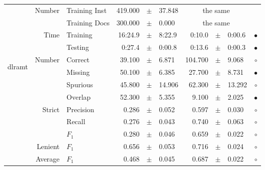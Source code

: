 \begin{longtable}{|r|r|l||rcl|rcl|c|}
\cline{2-10} & \multirow{2}{*}{    Number} &   Training Inst &     419.000 &  $\pm$  &      37.848 &    \multicolumn{3}{c|}{the same}         &  \\
\cline{3-10} &                             &   Training Docs &     300.000 &  $\pm$  &       0.000 &    \multicolumn{3}{c|}{the same}         &  \\
\cline{2-10} & \multirow{2}{*}{      Time} &        Training &     16:24.9 &  $\pm$  &      8:22.9 &      0:10.0 &  $\pm$  &      0:00.6 & $\bullet$ \\
\cline{3-10} &                             &         Testing &      0:27.4 &  $\pm$  &      0:00.8 &      0:13.6 &  $\pm$  &      0:00.3 & $\bullet$ \\
\hline
\hline
\multirow{11}{*}{\begin{sideways}dlramt\end{sideways} }
             & \multirow{4}{*}{    Number} &         Correct &      39.100 &  $\pm$  &       6.871 &     104.700 &  $\pm$  &       9.068 & $\circ$ \\
\cline{3-10} &                             &         Missing &      50.100 &  $\pm$  &       6.385 &      27.700 &  $\pm$  &       8.731 & $\bullet$ \\
\cline{3-10} &                             &        Spurious &      45.800 &  $\pm$  &      14.906 &      62.300 &  $\pm$  &      13.292 & $\circ$ \\
\cline{3-10} &                             &         Overlap &      52.300 &  $\pm$  &       5.355 &       9.100 &  $\pm$  &       2.025 & $\bullet$ \\
\cline{2-10} & \multirow{3}{*}{    Strict} &       Precision &       0.286 &  $\pm$  &       0.052 &       0.597 &  $\pm$  &       0.030 & $\circ$ \\
\cline{3-10} &                             &          Recall &       0.276 &  $\pm$  &       0.043 &       0.740 &  $\pm$  &       0.063 & $\circ$ \\
\cline{3-10} &                             &           $F_1$ &       0.280 &  $\pm$  &       0.046 &       0.659 &  $\pm$  &       0.022 & $\circ$ \\
\cline{2-10} &                     Lenient &           $F_1$ &       0.656 &  $\pm$  &       0.053 &       0.716 &  $\pm$  &       0.024 & $\circ$ \\
\cline{2-10} &                     Average &           $F_1$ &       0.468 &  $\pm$  &       0.045 &       0.687 &  $\pm$  &       0.022 & $\circ$ \\

\end{longtable}
